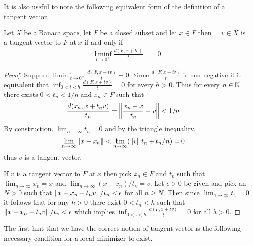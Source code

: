 It is also useful to note the following equivalent form of the definition of a tangent vector.
\begin{prop}Let $X$ be a Banach space, let $F$ be a closed subset and
  let $x \in F$ then = $v \in X$ is a tangent vector to $F$
  at $x$ if and only if
\begin{align*}
\liminf_{t \to 0^+} \frac{d(F, x+tv)}{t} &= 0
\end{align*}
\end{prop}
\begin{proof}
Suppose $\liminf_{t \to 0^+} \frac{d(F, x+tv)}{t} = 0$.  Since $\frac{d(F, x+tv)}{t}$ is non-negative it is equivalent that $\inf_{0 < t < h} \frac{d(F, x+tv)}{t} = 0$ for every $h >0$.  Thus for every $n \in \mathbb{N}$ there exists $0 < t_n < 1/n$
and $x_n \in F$ such that 
\begin{align*}
\frac{d(x_n, x+t_n v)}{t_n} &= \left \lVert \frac{ x_n - x}{t_n}-v \right \rVert < 1/n
\end{align*}
By construction, $\lim_{n \to \infty} t_n = 0$ and by the triangle inequality, 
\begin{align*}
\lim_{n \to \infty} \left \lVert x-x_n \right \rVert &< \lim_{n \to \infty} (\left \lVert v \right \rVert t_n + t_n/n) = 0
\end{align*}
thus $v$ is a tangent vector.

If $v$ is a tangent vector to $F$ at $x$ then pick $x_n \in F$ and $t_n$ such that $\lim_{n \to \infty} x_n = x$ and $\lim_{n \to \infty} (x-x_n)/t_n = v$.  Let $\epsilon>0$ be 
given and pick an $N>0$ such that $\left \lVert x - x_n -t_n v \right \rVert/t_n < \epsilon$ for all $n \geq N$.  Then since $\lim_{n \to \infty} t_n = 0$ it follows that for any $h>0$ there exist
$0 < t_n < h$ such that $\left \lVert x - x_n -t_n v \right \rVert/t_n < \epsilon$ which implies 
$\inf_{0 < t < h} \frac{d(F, x+tv)}{t} = 0$ for all $h > 0$.
\end{proof}

The first hint that we have the correct notion of tangent vector is
the following necessary condition for a local minimizer to exist.


